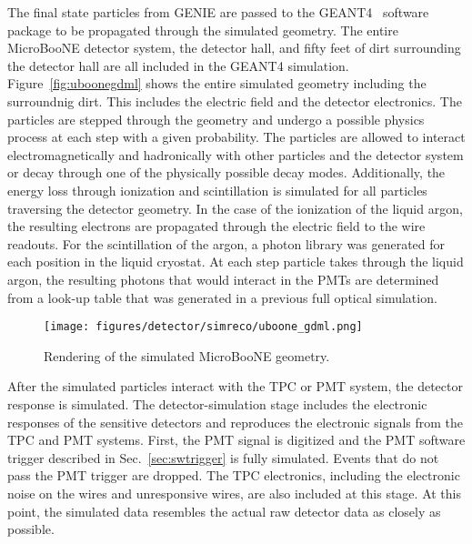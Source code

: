     The final state particles from GENIE are passed to the GEANT4~\cite{geant4}
    software package to be propagated through the simulated geometry.  The
    entire MicroBooNE detector system, the detector hall, and fifty feet of
    dirt surrounding the detector hall are all included in the GEANT4
    simulation. Figure~\ref{fig:uboonegdml} shows the entire simulated geometry
    including the surroundnig dirt. This includes the electric field and the
    detector electronics.  The particles are stepped through the geometry and
    undergo a possible physics process at each step with a given probability.
    The particles are allowed to interact electromagnetically and hadronically
    with other particles and the detector system or decay through one of the
    physically possible decay modes.  Additionally, the energy loss through
    ionization and scintillation is simulated for all particles traversing the
    detector geometry. In the case of the ionization of the liquid argon, the
    resulting electrons are propagated through the electric field to the wire
    readouts.  For the scintillation of the argon, a photon library was
    generated for each position in the liquid cryostat. At each step particle
    takes through the liquid argon, the resulting photons that would interact
    in the PMTs are determined from a look-up table that was generated in a
    previous full optical simulation. 

    \begin{figure}[h]
      \centering
      \texttt{[image: figures/detector/simreco/uboone\_gdml.png]}
      \caption{Rendering of the simulated MicroBooNE geometry.}
      \label{fig:uboonegpml}
    \end{figure}

    After the simulated particles interact with the TPC or PMT system, the
    detector response is simulated. The detector-simulation stage includes the
    electronic responses of the sensitive detectors and reproduces the
    electronic signals from the TPC and PMT systems. First, the PMT signal is
    digitized and the PMT software trigger described in
    Sec.~\ref{sec:swtrigger} is fully simulated. Events that do not pass the
    PMT trigger are dropped. The TPC electronics, including the electronic
    noise on the wires and unresponsive wires, are also included at this stage.
    At this point, the simulated data resembles the actual raw detector data as
    closely as possible.

